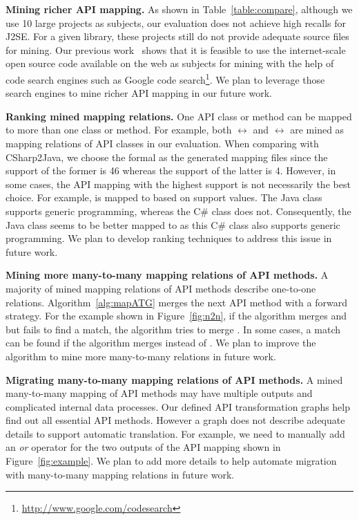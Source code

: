 \textbf{Mining richer API mapping.} As shown in
Table~\ref{table:compare}, although we use 10 large projects as
subjects, our evaluation does not achieve high recalls for J2SE. For
a given library, these projects still do not provide adequate source
files for mining. Our previous
work~\cite{thummalapenta07parseweb,thummalapentaase08spotweb} shows
that it is feasible to use the internet-scale open source code
available on the web as subjects for mining with the help of code
search engines such as Google code
search\footnote{\url{http://www.google.com/codesearch}}. We plan to
leverage those search engines to mine richer API mapping in our
future work.

\textbf{Ranking mined mapping relations.} One API class or method
can be mapped to more than one class or method. For example, both
$\leftrightarrow$ 
and $\leftrightarrow$
 are mined as mapping relations of API classes
in our evaluation. When comparing with CSharp2Java, we choose the
formal as the generated mapping files since the support of the
former is 46 whereas the support of the latter is 4. However, in
some cases, the API mapping with the highest support is not
necessarily the best choice. For example,
 is mapped to
 based on support values. The
Java class supports generic programming, whereas the C\# class does
not. Consequently, the Java class seems to be better mapped to
 as this C\# class also
supports generic programming. We plan to develop ranking techniques
to address this issue in future work.

\textbf{Mining more many-to-many mapping relations of API methods.}
A majority of mined mapping relations of API methods describe
one-to-one relations. Algorithm~\ref{alg:mapATG} merges the next API
method with a forward strategy. For the example shown in
Figure~\ref{fig:n2n}, if the algorithm merges  and
 but fails to find a match, the algorithm tries to
merge . In some cases, a match can be found if the
algorithm merges  instead of .
We plan to improve the algorithm to mine more many-to-many relations
in future work.

\textbf{Migrating many-to-many mapping relations of API methods.} A
mined many-to-many mapping of API methods may have multiple outputs
and complicated internal data processes. Our defined API
transformation graphs help find out all essential API methods.
However a graph does not describe adequate details to support
automatic translation. For example, we need to manually add an
\emph{or} operator for the two outputs of the API mapping shown in
Figure~\ref{fig:example}. We plan to add more details to help
automate migration with many-to-many mapping relations in future
work.

